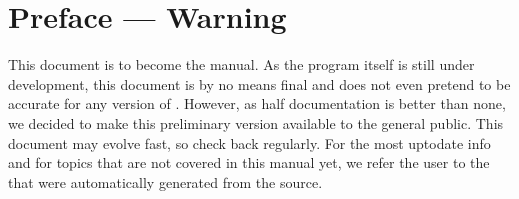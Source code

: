
\chapter*{Preface --- Warning}
\label{preface}
This document is to become the \pyformex manual. As the \pyformex program itself is still under development, this document is by no means final and does not even pretend to be accurate for any version of \pyformex. 
However, as half documentation is better than none, we decided to make this preliminary version available to the general public. This document may evolve fast, so check back regularly.
For the most uptodate info and for topics that are not covered in this manual yet, we refer the user to the  that were automatically generated from the \pyf source.

